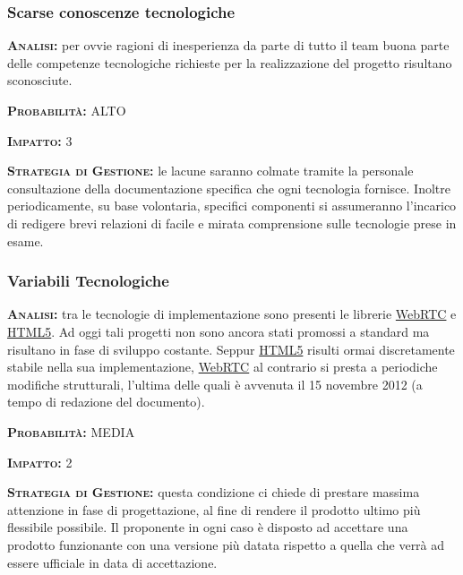 \subsubsection{Scarse conoscenze tecnologiche}
\begin{description}
	\item{\scshape\bfseries Analisi:} per ovvie ragioni di inesperienza da parte di tutto il team buona parte delle competenze tecnologiche richieste per la realizzazione del progetto risultano sconosciute.
	\item{\scshape\bfseries Probabilità:} ALTO
	\item{\scshape\bfseries Impatto:} 3
	\item{\scshape\bfseries Strategia di Gestione:} le lacune saranno colmate tramite la personale consultazione della documentazione specifica che ogni tecnologia fornisce. Inoltre periodicamente, su base volontaria, specifici componenti si assumeranno l'incarico di redigere brevi relazioni di facile e mirata comprensione sulle tecnologie prese in esame.
\end{description}

\subsubsection{Variabili Tecnologiche}
\begin{description}
	\item{\scshape\bfseries Analisi:} tra le tecnologie di implementazione sono presenti le librerie \underline{WebRTC} e \underline{HTML5}. Ad oggi tali progetti non sono ancora stati promossi a standard ma risultano in fase di sviluppo costante. Seppur \underline{HTML5} risulti ormai discretamente stabile nella sua implementazione, \underline{WebRTC} al contrario si presta a periodiche modifiche strutturali, l'ultima delle quali è avvenuta il 15 novembre 2012 (a tempo di redazione del documento).
	\item{\scshape\bfseries Probabilità:} MEDIA
	\item{\scshape\bfseries Impatto:} 2
	\item{\scshape\bfseries Strategia di Gestione:} questa condizione ci chiede di prestare massima attenzione in fase di progettazione, al fine di rendere il prodotto ultimo più flessibile possibile. Il proponente in ogni caso è disposto ad accettare una prodotto funzionante con una versione più datata rispetto a quella che verrà ad essere ufficiale in data di accettazione.
\end{description}

